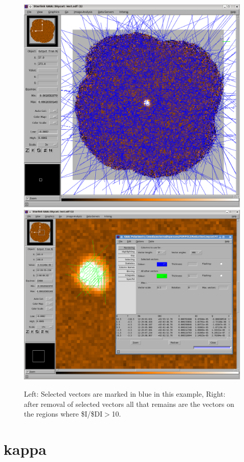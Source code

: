 \begin{figure}[t!]
\begin{center}
\includegraphics[width=0.44\linewidth]{sc22-gaia-plot-vectors-5.png}
\includegraphics[width=0.52\linewidth]{sc22-gaia-plot-vectors-7.png}
\label{fig:gaia-plot-vectors3}
\caption [Over Plotting Vectors in GAIA]{
  \small Left: Selected vectors are marked in blue in this example, Right: after removal of selected
vectors all that remains are the vectors on the regions where \$I/\$DI$>$10. 
}
\end{center}
\end{figure}


\section{kappa}


